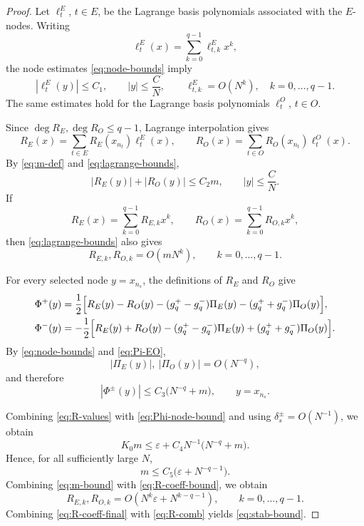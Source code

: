 \documentclass[11pt,a4paper]{article}
\theoremstyle{definition}
\begin{document}
\begin{proof}
Let $\ell_t^E$, $t\in E$, be the Lagrange basis polynomials associated
with the $E$-nodes. Writing
\[
\ell_t^E(x)
=
\sum_{k=0}^{q-1}\ell_{t,k}^E x^k,
\]
the node estimates \eqref{eq:node-bounds} imply
\begin{equation}\label{eq:lagrange-bounds}
|\ell_t^E(y)|\leq C_1,
\qquad
|y|\leq\frac{C}{N},
\qquad
\ell_{t,k}^E=O(N^k),
\quad
k=0,\dots,q-1.
\end{equation}
The same estimates hold for the Lagrange basis polynomials
$\ell_t^O$, $t\in O$.

Since $\deg R_E,\deg R_O\leq q-1$, Lagrange interpolation gives
\[
R_E(x)
=
\sum_{t\in E}R_E(x_{n_t})\ell_t^E(x),
\qquad
R_O(x)
=
\sum_{t\in O}R_O(x_{n_t})\ell_t^O(x).
\]
By \eqref{eq:m-def} and \eqref{eq:lagrange-bounds},
\[
|R_E(y)|+|R_O(y)|
\leq
C_2m,
\qquad
|y|\leq\frac{C}{N}.
\]
If
\[
R_E(x)=\sum_{k=0}^{q-1}R_{E,k}x^k,
\qquad
R_O(x)=\sum_{k=0}^{q-1}R_{O,k}x^k,
\]
then \eqref{eq:lagrange-bounds} also gives
\begin{equation}\label{eq:R-coeff-bound}
R_{E,k},R_{O,k}
=
O(mN^k),
\qquad
k=0,\dots,q-1.
\end{equation}

For every selected node $y=x_{n_s}$, the definitions of $R_E$ and
$R_O$ give
\[
\begin{aligned}
\Phi^+(y)
&=
\frac{1}{2}\Bigl[
R_E(y)-R_O(y)
-(g_q^+-g_q^-)\Pi_E(y)
-(g_q^++g_q^-)\Pi_O(y)
\Bigr],
\\
\Phi^-(y)
&=
-\frac{1}{2}\Bigl[
R_E(y)+R_O(y)
-(g_q^+-g_q^-)\Pi_E(y)
+(g_q^++g_q^-)\Pi_O(y)
\Bigr].
\end{aligned}
\]
By \eqref{eq:node-bounds} and \eqref{eq:Pi-EO},
\[
|\Pi_E(y)|,\ |\Pi_O(y)|=O(N^{-q}),
\]
and therefore
\begin{equation}\label{eq:Phi-node-bound}
|\Phi^\pm(y)|
\leq
C_3\bigl(N^{-q}+m\bigr),
\qquad
y=x_{n_s}.
\end{equation}

Combining \eqref{eq:R-values} with \eqref{eq:Phi-node-bound} and using
$\delta_s^\pm=O(N^{-1})$, we obtain
\begin{equation}\label{eq:m-ineq}
K_0m
\leq
\varepsilon
+
C_4N^{-1}\bigl(N^{-q}+m\bigr).
\end{equation}
Hence, for all sufficiently large $N$,
\begin{equation}\label{eq:m-bound}
m
\leq
C_5\bigl(\varepsilon+N^{-q-1}\bigr).
\end{equation}
Combining \eqref{eq:m-bound} with \eqref{eq:R-coeff-bound}, we obtain
\begin{equation}\label{eq:R-coeff-final}
R_{E,k},R_{O,k}
=
O\!\left(N^k\varepsilon+N^{k-q-1}\right),
\qquad
k=0,\dots,q-1.
\end{equation}
Combining \eqref{eq:R-coeff-final} with \eqref{eq:R-comb} yields
\eqref{eq:stab-bound}.


\end{proof}
\end{document}
